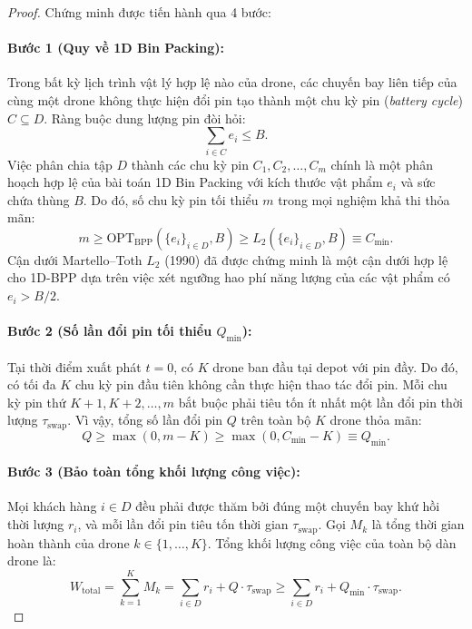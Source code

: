 \documentclass[12pt,a4paper]{article}
\newcommand{\swap}{\tau_{\mathrm{swap}}}
\begin{document}
\begin{proof}
Chứng minh được tiến hành qua 4 bước:

\paragraph{Bước 1 (Quy về 1D Bin Packing):} 
Trong bất kỳ lịch trình vật lý hợp lệ nào của drone, các chuyến bay liên tiếp của cùng một drone không thực hiện đổi pin tạo thành một chu kỳ pin (\emph{battery cycle}) $C \subseteq D$. Ràng buộc dung lượng pin đòi hỏi:
\[
    \sum_{i \in C} e_i \le B.
\]
Việc phân chia tập $D$ thành các chu kỳ pin $C_1, C_2, \dots, C_m$ chính là một phân hoạch hợp lệ của bài toán 1D Bin Packing với kích thước vật phẩm $e_i$ và sức chứa thùng $B$. Do đó, số chu kỳ pin tối thiểu $m$ trong mọi nghiệm khả thi thỏa mãn:
\[
    m \ge \mathrm{OPT}_{\mathrm{BPP}}(\{e_i\}_{i \in D}, B) \ge L_2(\{e_i\}_{i \in D}, B) \equiv C_{\min}.
\]
Cận dưới Martello--Toth $L_2$ (1990) đã được chứng minh là một cận dưới hợp lệ cho 1D-BPP dựa trên việc xét ngưỡng hao phí năng lượng của các vật phẩm có $e_i > B/2$.

\paragraph{Bước 2 (Số lần đổi pin tối thiểu $Q_{\min}$):}
Tại thời điểm xuất phát $t = 0$, có $K$ drone ban đầu tại depot với pin đầy. Do đó, có tối đa $K$ chu kỳ pin đầu tiên không cần thực hiện thao tác đổi pin. Mỗi chu kỳ pin thứ $K+1, K+2, \dots, m$ bắt buộc phải tiêu tốn ít nhất một lần đổi pin thời lượng $\swap$. 
Vì vậy, tổng số lần đổi pin $Q$ trên toàn bộ $K$ drone thỏa mãn:
\[
    Q \ge \max(0, m - K) \ge \max(0, C_{\min} - K) \equiv Q_{\min}.
\]

\paragraph{Bước 3 (Bảo toàn tổng khối lượng công việc):}
Mọi khách hàng $i \in D$ đều phải được thăm bởi đúng một chuyến bay khứ hồi thời lượng $r_i$, và mỗi lần đổi pin tiêu tốn thời gian $\swap$. Gọi $M_k$ là tổng thời gian hoàn thành của drone $k \in \{1, \dots, K\}$. Tổng khối lượng công việc của toàn bộ dàn drone là:
\[
    W_{\mathrm{total}} = \sum_{k=1}^K M_k = \sum_{i \in D} r_i + Q \cdot \swap \ge \sum_{i \in D} r_i + Q_{\min} \cdot \swap.
\]


\end{proof}
\end{document}
